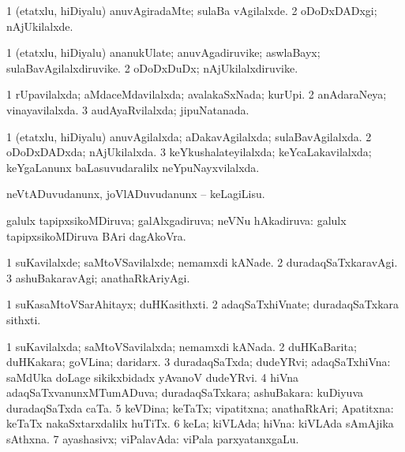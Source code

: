 \bentry
{} 
\gl{\kirxvi}
\expl{}
\bmng
\bnum
\num{1} (etatxlu, hiDiyalu) anuvAgiradaMte; sulaBa vAgilalxde. 
\num{2} oDoDxDADxgi; nAjUkilalxde. 
\enum
\emng
\eentry

\bentry
{} 
\gl{\nA}
\expl{}
\bmng
\bnum
\num{1} (etatxlu, hiDiyalu) ananukUlate; anuvAgadiruvike; aswlaBayx; sulaBavAgilalxdiruvike. 
\num{2} oDoDxDuDx; nAjUkilalxdiruvike. 
\enum
\emng
\eentry

\bentry
{} 
\gl{\gu}
\expl{}
\bmng
\bnum
\num{1} rUpavilalxda; aMdaceMdavilalxda; avalakaSxNada; kurUpi. 
\num{2} anAdaraNeya; vinayavilalxda. 
\num{3} audAyaRvilalxda; jipuNatanada. 
\enum
\emng
\eentry

\bentry
{} 
\gl{\gu}
\bmng
\bnum
\num{1} (etatxlu, hiDiyalu) anuvAgilalxda; aDakavAgilalxda; sulaBavAgilalxda. 
\num{2} oDoDxDADxda; nAjUkilalxda. 
\num{3} keYkushalateyilalxda; keYcaLakavilalxda; keYgaLanunx baLasuvudaralilx neYpuNayxvilalxda. 
\enum
\emng
\eentry

\bentry
{} 
\gl{\akirx}
\bmng
neVtADuvudanunx, joVlADuvudanunx -- keLagiLisu. 
\emng
\eentry

\bentry
{} 
\gl{\gu}
\expl{}
\bmng
galulx tapipxsikoMDiruva; galAlxgadiruva; neVNu hAkadiruva:  galulx tapipxsikoMDiruva BAri dagAkoVra. 
\emng
\eentry

\bentry
{} 
\gl{\kirxvi}
\bmng
\bnum
\num{1} suKavilalxde; saMtoVSavilalxde; nemamxdi kANade. 
\num{2} duradaqSaTxkaravAgi. 
\num{3} ashuBakaravAgi; anathaRkAriyAgi. 
\enum
\emng
\eentry

\bentry
{} 
\gl{\nA}
\expl{}
\bmng
\bnum
\num{1} suKasaMtoVSarAhitayx; duHKasithxti. 
\num{2} adaqSaTxhiVnate; duradaqSaTxkara sithxti. 
\enum
\emng
\eentry

\bentry
{} 
\gl{\gu}
\bmng
\bnum
\num{1} suKavilalxda; saMtoVSavilalxda; nemamxdi kANada. 
\num{2} duHKaBarita; duHKakara; goVLina; daridarx. 
\num{3} duradaqSaTxda; dudeYRvi; adaqSaTxhiVna:  saMdUka doLage sikikxbidadx yAvanoV dudeYRvi. 
\num{4} hiVna adaqSaTxvanunxMTumADuva; duradaqSaTxkara; ashuBakara:  kuDiyuva duradaqSaTxda caTa. 
\num{5} keVDina; keTaTx; vipatitxna; anathaRkAri; Apatitxna:  keTaTx nakaSxtarxdalilx huTiTx. 
\num{6} keLa; kiVLAda; hiVna:  kiVLAda sAmAjika sAthxna. 
\num{7} ayashasivx; viPalavAda:  viPala parxyatanxgaLu. 
\enum
\emng
\eentry


